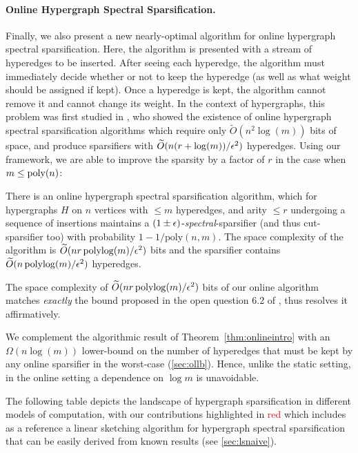\documentclass{article}
\begin{document}
\paragraph{Online Hypergraph Spectral Sparsification.} Finally, we also present a new nearly-optimal algorithm for online hypergraph spectral sparsification. Here, the algorithm is presented with a stream of hyperedges to be inserted. After seeing each hyperedge, the algorithm must immediately decide whether or not to keep the hyperedge (as well as what weight should be assigned if kept). Once a hyperedge is kept, the algorithm cannot remove it and cannot change its weight. In the context of hypergraphs, this problem was first studied in \cite{STY24}, who showed the existence of online hypergraph spectral sparsification algorithms which require only $\widetilde{O}(n^2 \log(m))$ bits of space, and produce sparsifiers with $\widetilde{O}(n(r + \log(m)) / \epsilon^2)$ hyperedges. Using our framework, we are able to improve the sparsity
by a factor of $r$ in the case when $m\leq \mathrm{poly}(n)$:

\begin{theorem}\label{thm:onlineintro}
    There is an online hypergraph spectral sparsification algorithm, which for hypergraphs $H$ on $n$ vertices with $\leq m$ hyperedges, and arity $\leq r$ undergoing a sequence of insertions maintains a $(1 \pm \epsilon)$-\emph{spectral}-sparsifier (and thus cut-sparsifier too) with probability $1 - 1 / \mathrm{poly}(n,m)$. The space complexity of the algorithm is $\widetilde{O}(nr\operatorname{polylog}(m) / \epsilon^2)$ bits and the sparsifier contains $\widetilde{O}(n \operatorname{polylog}(m) / \epsilon^2)$ hyperedges.
\end{theorem}
The space complexity of $\widetilde{O}(nr\operatorname{polylog}(m) / \epsilon^2)$ bits of our online algorithm matches
\textit{exactly}
the bound proposed in the open question 6.2 of \cite{STY24}, thus resolves it affirmatively.

We complement the algorithmic result of Theorem~\ref{thm:onlineintro} with an $\Omega(n \log(m))$ lower-bound on the number of hyperedges that must be kept by any online sparsifier in the worst-case (\cref{sec:ollb}). Hence, unlike the static setting, in the online setting a dependence on $\log m$ is unavoidable.

The following table depicts the landscape of hypergraph sparsification in different models of computation,
with our contributions highlighted in \textcolor{red}{red} which includes as a reference a linear sketching algorithm for hypergraph spectral sparsification that can be easily derived from known results (see \cref{sec:lsnaive}).
\end{document}
